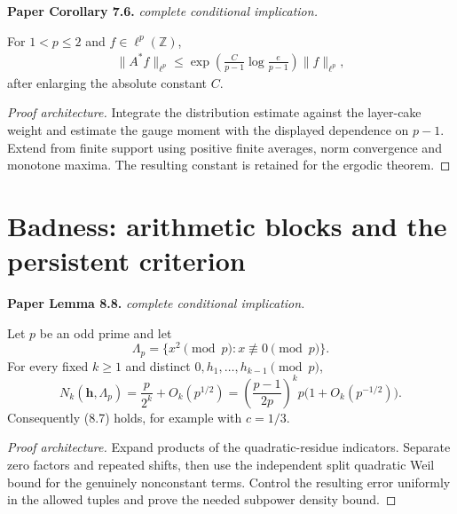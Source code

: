 \begin{lemma}
\label{near_one_lp}
\leanok
\par\medskip\noindent\textbf{Paper Corollary 7.6.} \textit{complete conditional implication.}\par
For \(1<p\leq2\) and \(f\in\ell^p(\mathbb Z)\),
\begin{align}
 \|A^*f\|_{\ell^p}
 \leq
 \exp\left(
 \frac{C}{p-1}\log\frac{e}{p-1}
 \right)\|f\|_{\ell^p},
\end{align}
after enlarging the absolute constant \(C\).
\end{lemma}
\begin{proof}[Proof architecture]
\leanok
Integrate the distribution estimate against the layer-cake weight and estimate the gauge moment with the displayed dependence on $p-1$. Extend from finite support using positive finite averages, norm convergence and monotone maxima. The resulting constant is retained for the ergodic theorem.
\end{proof}

\section{Badness: arithmetic blocks and the persistent criterion}

\begin{lemma}
\label{quadratic_correlations}
\leanok
\par\medskip\noindent\textbf{Paper Lemma 8.8.} \textit{complete conditional implication.}\par
Let $p$ be an odd prime and let
\[
 \Lambda_p=\{x^2\pmod p:x\not\equiv0\pmod p\}.
\]
For every fixed $k\geq1$ and distinct
$0,h_1,\ldots,h_{k-1}\pmod p$,
\[
 N_k(\mathbf h,\Lambda_p)=\frac{p}{2^k}+O_k(p^{1/2})
 =\left(\frac{p-1}{2p}\right)^kp\big(1+O_k(p^{-1/2})\big).
\]
Consequently \textup{(8.7)} holds, for example with $c=1/3$.
\end{lemma}
\begin{proof}[Proof architecture]
\leanok
Expand products of the quadratic-residue indicators. Separate zero factors and repeated shifts, then use the independent split quadratic Weil bound for the genuinely nonconstant terms. Control the resulting error uniformly in the allowed tuples and prove the needed subpower density bound.
\end{proof}

